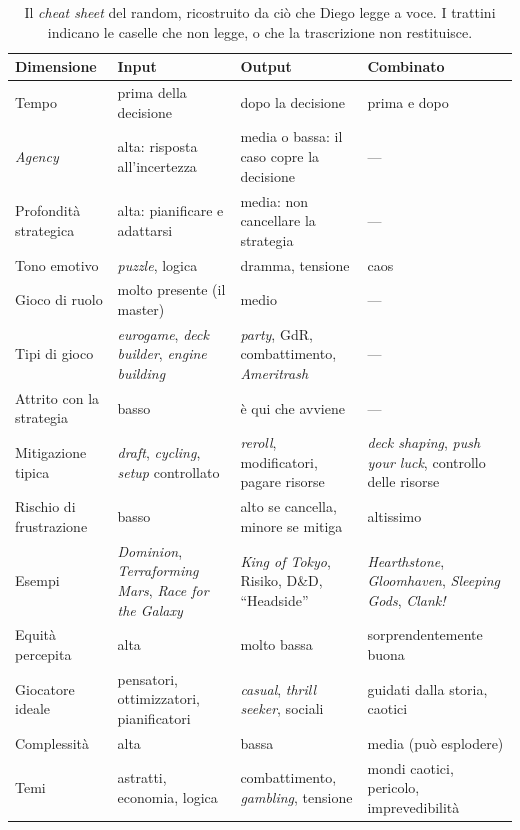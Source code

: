 \begin{table}[htbp]
\centering
\footnotesize
\begin{tabular}{@{}>{\raggedright\arraybackslash}p{2.3cm}>{\raggedright\arraybackslash}p{3.7cm}>{\raggedright\arraybackslash}p{3.7cm}>{\raggedright\arraybackslash}p{3.7cm}@{}}
\toprule
\textbf{Dimensione} & \textbf{Input} & \textbf{Output} & \textbf{Combinato} \\
\midrule
Tempo & prima della decisione & dopo la decisione & prima e dopo \\
\addlinespace
\emph{Agency} & alta: risposta all'incertezza & media o bassa: il caso copre la decisione &
  --- \\
\addlinespace
Profondità strategica & alta: pianificare e adattarsi & media: non cancellare la strategia
  & --- \\
\addlinespace
Tono emotivo & \emph{puzzle}, logica & dramma, tensione & caos \\
\addlinespace
Gioco di ruolo & molto presente (il master) & medio & --- \\
\addlinespace
Tipi di gioco & \emph{eurogame}, \emph{deck builder}, \emph{engine building} & \emph{party},
  GdR, combattimento, \emph{Ameritrash} & --- \\
\addlinespace
Attrito con la strategia & basso & è qui che avviene & --- \\
\addlinespace
Mitigazione tipica & \emph{draft}, \emph{cycling}, \emph{setup} controllato & \emph{reroll},
  modificatori, pagare risorse & \emph{deck shaping}, \emph{push your luck}, controllo delle
  risorse \\
\addlinespace
Rischio di frustrazione & basso & alto se cancella, minore se mitiga & altissimo \\
\addlinespace
Esempi & \emph{Dominion}, \emph{Terraforming Mars}, \emph{Race for the Galaxy} & \emph{King
  of Tokyo}, Risiko, D\&D, ``Headside''\protect\footnotemark & \emph{Hearthstone},
  \emph{Gloomhaven}, \emph{Sleeping Gods}, \emph{Clank!} \\
\addlinespace
Equità percepita & alta & molto bassa & sorprendentemente buona \\
\addlinespace
Giocatore ideale & pensatori, ottimizzatori, pianificatori & \emph{casual}, \emph{thrill
  seeker}, sociali & guidati dalla storia, caotici \\
\addlinespace
Complessità & alta & bassa & media (può esplodere) \\
\addlinespace
Temi & astratti, economia, logica & combattimento, \emph{gambling}, tensione & mondi caotici,
  pericolo, imprevedibilità \\
\bottomrule
\end{tabular}
\caption{Il \emph{cheat sheet} del random, ricostruito da ciò che Diego legge a voce. I
trattini indicano le caselle che non legge, o che la trascrizione non restituisce.}
\label{a15:tab:cheatsheet}
\end{table}

